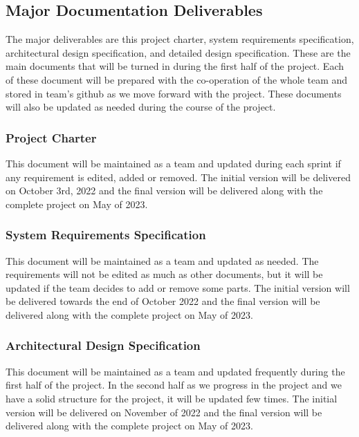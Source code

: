 
\subsection{Major Documentation Deliverables}
The major deliverables are this project charter, system requirements specification, architectural design specification, and detailed design specification. These are the main documents that will be turned in during the first half of the project. Each of these document will be prepared with the co-operation of the whole team and stored in team's github as we move forward with the project. These documents will also be updated as needed during the course of the project. 

\subsubsection{Project Charter}
This document will be maintained as a team and updated during each sprint if any requirement is edited, added or removed. The initial version will be delivered on October 3rd, 2022 and the final version will be delivered along with the complete project on May of 2023.

\subsubsection{System Requirements Specification}
This document will be maintained as a team and updated as needed. The requirements will not be edited as much as other documents, but it will be updated if the team decides to add or remove some parts. The initial version will be delivered towards the end of October 2022 and the final version will be delivered along with the complete project on May of 2023.

\subsubsection{Architectural Design Specification}
This document will be maintained as a team and updated frequently during the first half of the project. In the second half as we progress in the project and we have a solid structure for the project, it will be updated few times. The initial version will be delivered on November of 2022 and the final version will be delivered along with the complete project on May of 2023.

